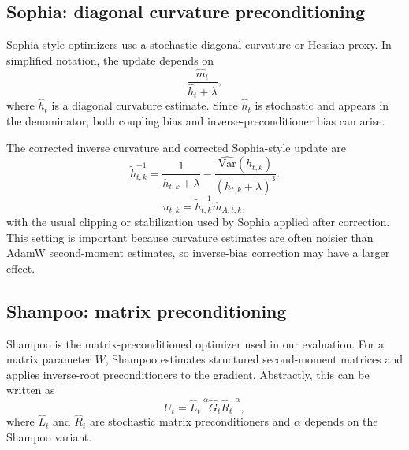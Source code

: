 \documentclass{article}
\newcommand{\Var}{\mathrm{Var}}
\begin{document}
\subsection{Sophia: diagonal curvature preconditioning}

Sophia-style optimizers use a stochastic diagonal curvature or Hessian proxy. In simplified notation, the update depends on
\begin{equation}
    \frac{\hat m_t}{\hat h_t+\lambda},
\end{equation}
where $\hat h_t$ is a diagonal curvature estimate. Since $\hat h_t$ is stochastic and appears in the denominator, both coupling bias and inverse-preconditioner bias can arise.

The corrected inverse curvature and corrected Sophia-style update are
\begin{equation}
    \widetilde h_{t,k}^{-1}
    =
    \frac{1}{\bar h_{t,k}+\lambda}
    -
    \frac{\widehat{\Var}(\bar h_{t,k})}{(\bar h_{t,k}+\lambda)^3}.
\end{equation}
\begin{equation}
    u_{t,k}
    =
    \widetilde h_{t,k}^{-1}\hat m_{A,t,k},
\end{equation}
with the usual clipping or stabilization used by Sophia applied after correction. This setting is important because curvature estimates are often noisier than AdamW second-moment estimates, so inverse-bias correction may have a larger effect.

\subsection{Shampoo: matrix preconditioning}

Shampoo is the matrix-preconditioned optimizer used in our evaluation. For a matrix parameter $W$, Shampoo estimates structured second-moment matrices and applies inverse-root preconditioners to the gradient. Abstractly, this can be written as
\begin{equation}
    U_t = \hat L_t^{-\alpha} \hat G_t \hat R_t^{-\alpha},
\end{equation}
where $\hat L_t$ and $\hat R_t$ are stochastic matrix preconditioners and $\alpha$ depends on the Shampoo variant.
\end{document}

